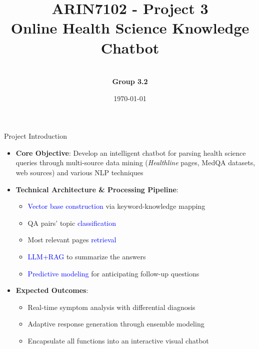 \documentclass{beamer}
\title{ARIN7102 - Project 3 \\Online Health Science Knowledge Chatbot}
\author{\textbf{\\Group 3.2}}
\date{\today}
\begin{document}
	
	\frame{\titlepage}
	
	\begin{frame}{Project Introduction}
		\begin{itemize}
			\item \textbf{Core Objective}: Develop an intelligent chatbot for parsing health science queries through multi-source data mining (\textit{Healthline} pages, MedQA datasets, web sources) and various NLP techniques
			\item \textbf{Technical Architecture \& Processing Pipeline}: 
			\begin{itemize}
				\item \textcolor{blue}{Vector base construction} via keyword-knowledge mapping
				\item QA pairs' topic \textcolor{blue}{classification}
				\item Most relevant pages \textcolor{blue}{retrieval}
				\item \textcolor{blue}{LLM+RAG} to summarize the answers
				\item \textcolor{blue}{Predictive modeling} for anticipating follow-up questions
			\end{itemize}
			
			\item \textbf{Expected Outcomes}:
				\begin{itemize}
					\item Real-time symptom analysis with differential diagnosis
					\item Adaptive response generation through ensemble modeling
					\item Encapsulate all functions into an interactive visual chatbot
				\end{itemize}
		\end{itemize}
	\end{frame}
	
\end{document}
